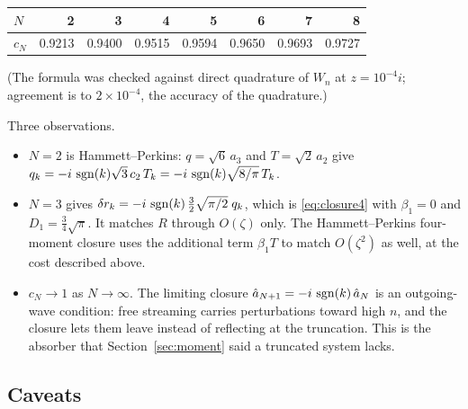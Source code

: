 \begin{center}
\begin{tabular}{lrrrrrrr}
\toprule
$N$ & 2 & 3 & 4 & 5 & 6 & 7 & 8 \\
\midrule
$c_N$ & 0.9213 & 0.9400 & 0.9515 & 0.9594 & 0.9650 & 0.9693 & 0.9727 \\
\bottomrule
\end{tabular}
\end{center}
(The formula was checked against direct quadrature of $W_n$ at
$z=10^{-4}i$; agreement is to $2\times10^{-4}$, the accuracy of the
quadrature.)

Three observations.
\begin{itemize}
  \item $N=2$ is Hammett--Perkins:
    $q=\sqrt6\,a_3$ and $T=\sqrt2\,a_2$ give
    $q_k=-i\,\operatorname{sgn}(k)\sqrt3\,c_2\,T_k=-i\,\operatorname{sgn}(k)\sqrt{8/\pi}\,T_k$.
  \item $N=3$ gives $\delta r_k=-i\,\operatorname{sgn}(k)\,\tfrac32\sqrt{\pi/2}\;q_k$,
    which is \eqref{eq:closure4} with $\beta_1=0$ and
    $D_1=\tfrac{3}{4}\sqrt\pi$. It matches $R$ through $O(\zeta)$ only. The
    Hammett--Perkins four-moment closure uses the additional term
    $\beta_1T$ to match $O(\zeta^2)$ as well, at the cost described above.
  \item $c_N\to1$ as $N\to\infty$. The limiting closure
    $\hat a_{N+1}=-i\,\operatorname{sgn}(k)\,\hat a_N$ is an outgoing-wave condition:
    free streaming carries perturbations toward high $n$, and the closure
    lets them leave instead of reflecting at the truncation. This is the
    absorber that Section~\ref{sec:moment} said a truncated system lacks.
\end{itemize}

\subsection{Caveats}
\label{sec:hp-caveats}


